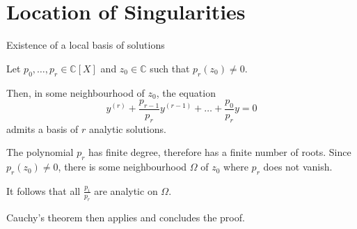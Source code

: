 \documentclass[../main.tex]{subfiles}
\begin{document}


\section{Location of Singularities}

%
%
%
%
%
%
%


\begin{thm}{Existence of a local basis of solutions}
	
	Let $p_0, \dots, p_r \in \mathbb{C}[X]$ and $z_0 \in \mathbb{C}$ such that $p_r (z_0) \neq 0$.
	
	Then, in some neighbourhood of $z_0$, the equation
	\begin{equation}
	y^{(r)} + \frac{p_{r-1}}{p_r} y^{(r - 1)} + \dots + \frac{p_0}{p_r} y = 0
	\end{equation}
	admits a basis of $r$ analytic solutions.
	
	\tcblower
	
	The polynomial $p_r$ has finite degree, therefore has a finite number of roots. Since $p_r(z_0) \neq 0$, there is some neighbourhood $\Omega$ of $z_0$ where $p_r$ does not vanish.
	
	It follows that all $\frac{p_i}{p_r}$ are analytic on $\Omega$.
	
	Cauchy's theorem then applies and concludes the proof.
\end{thm}
\end{document}
